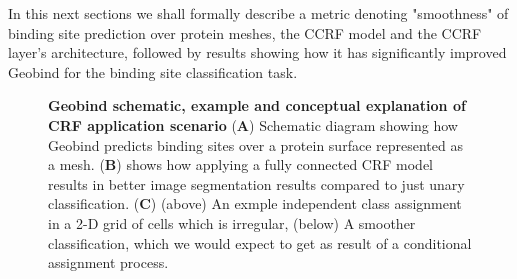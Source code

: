 In this next sections we shall formally describe a metric  denoting "smoothness" of binding site
prediction over protein meshes, the CCRF model and the CCRF layer's architecture, followed
by results showing how it has significantly improved Geobind for the binding site classification task.
\begin{center} 
 \begin{figure}[!htp]
        \caption[Geobind schematic, example and conceptual explanation of CRF application scenario]{\textbf{Geobind schematic, example and conceptual explanation of CRF application scenario}
        ({\bf A}) Schematic diagram showing how Geobind predicts binding sites over a protein surface represented as a mesh. ({\bf B}) \citet{krahenbuhl2012efficient} shows how applying a fully connected CRF model results in better image segmentation results compared to 
        just unary classification. ({\bf C}) (above) An exmple independent class assignment in a 2-D grid of cells which is irregular, (below) A smoother classification, which we would 
        expect to get as result of a conditional assignment process.}
        \label{fig:crf_concept} \end{figure} \end{center}
